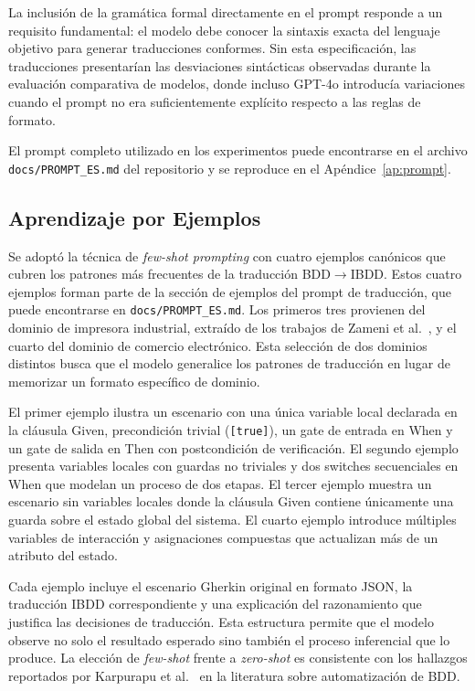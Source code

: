 La inclusión de la gramática formal directamente en el prompt responde a un requisito fundamental: el modelo debe conocer la sintaxis exacta del lenguaje objetivo para generar traducciones conformes. Sin esta especificación, las traducciones presentarían las desviaciones sintácticas observadas durante la evaluación comparativa de modelos, donde incluso GPT-4o introducía variaciones cuando el prompt no era suficientemente explícito respecto a las reglas de formato.

El prompt completo utilizado en los experimentos puede encontrarse en el archivo \texttt{docs/PROMPT\_ES.md} del repositorio y se reproduce en el Apéndice~\ref{ap:prompt}.

\subsection{Aprendizaje por Ejemplos}

Se adoptó la técnica de \textit{few-shot prompting} con cuatro ejemplos canónicos que cubren los patrones más frecuentes de la traducción BDD$\rightarrow$IBDD. Estos cuatro ejemplos forman parte de la sección de ejemplos del prompt de traducción, que puede encontrarse en \texttt{docs/PROMPT\_ES.md}. Los primeros tres provienen del dominio de impresora industrial, extraído de los trabajos de Zameni et al.~\cite{zameni2024ibdd}, y el cuarto del dominio de comercio electrónico. Esta selección de dos dominios distintos busca que el modelo generalice los patrones de traducción en lugar de memorizar un formato específico de dominio.

El primer ejemplo ilustra un escenario con una única variable local declarada en la cláusula Given, precondición trivial (\texttt{[true]}), un gate de entrada en When y un gate de salida en Then con postcondición de verificación. El segundo ejemplo presenta variables locales con guardas no triviales y dos switches secuenciales en When que modelan un proceso de dos etapas. El tercer ejemplo muestra un escenario sin variables locales donde la cláusula Given contiene únicamente una guarda sobre el estado global del sistema. El cuarto ejemplo introduce múltiples variables de interacción y asignaciones compuestas que actualizan más de un atributo del estado.

Cada ejemplo incluye el escenario Gherkin original en formato JSON, la traducción IBDD correspondiente y una explicación del razonamiento que justifica las decisiones de traducción. Esta estructura permite que el modelo observe no solo el resultado esperado sino también el proceso inferencial que lo produce. La elección de \textit{few-shot} frente a \textit{zero-shot} es consistente con los hallazgos reportados por Karpurapu et al.~\cite{karpurapu2024llm} en la literatura sobre automatización de BDD.

